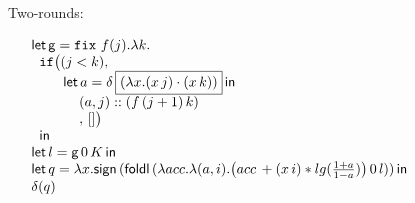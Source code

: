 \documentclass[a4paper,11pt]{article}
\theoremstyle{definition}
\begin{document}
\begin{figure}

Two-rounds:

\[
\begin{array}{l}
 \mathsf{let}\, \mathsf{g} = \mathop{\mathtt{fix}} \, f(j). \lambda k.  \\
 \hspace{.2cm} \mathtt{if} \big (  (j < k)  ,  \\
  \hspace{.8cm} \mathsf{let} \, a = \delta \, \boxed{( \lambda x. (x \,j)\cdot (x \,k) )}  \, \mathsf{in} \\
  \hspace{1.2cm} (a, j) :: (f  \,(j+1) \, k) \\
 \hspace{1.2cm} , \, [] \big) \\
  \hspace{.2cm} \mathsf{in} \\
  \mathsf{let}\, l = \mathsf{g} \, 0\, K \, \mathsf{in} \\
  \mathsf{let} \,  q =  \lambda x. \mathsf{sign} \, (\mathsf{foldl} \, (\lambda acc. \lambda (a,i). \big(acc\,+ (x \, i) *lg(\frac{1+a}{1-a})  \big) \, 0 \, l )) \, \mathsf{in} \\
  \delta ( q )
\end{array}
\]
\end{figure}







\end{document}
